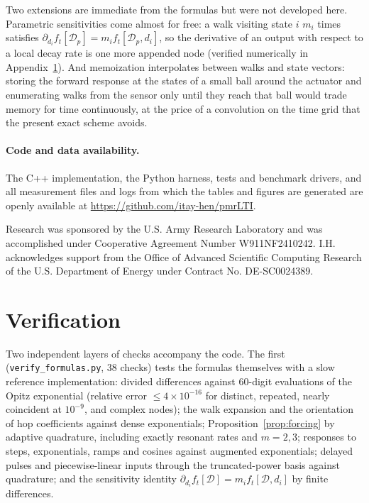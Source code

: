 \documentclass[aps,pra,superscriptaddress,floatfix,longbibliography,twocolumn]{revtex4-2}
\begin{document}
Two extensions are immediate from the formulas but were not developed here. Parametric sensitivities come almost for free: a walk visiting state $i$ $m_i$ times satisfies $\partial_{d_i}f_t[\mathcal{D}_p]=m_if_t[\mathcal{D}_p,d_i]$, so the derivative of an output with respect to a local decay rate is one more appended node (verified numerically in Appendix~\ref{app:verification}). And memoization interpolates between walks and state vectors: storing the forward response at the states of a small ball around the actuator and enumerating walks from the sensor only until they reach that ball would trade memory for time continuously, at the price of a convolution on the time grid that the present exact scheme avoids.

\paragraph*{Code and data availability.} The C++ implementation, the Python harness, tests and benchmark drivers, and all measurement files and logs from which the tables and figures are generated are openly available at \url{https://github.com/itay-hen/pmrLTI}.

\begin{acknowledgments}
Research was sponsored by the U.S. Army Research Laboratory and was accomplished under Cooperative Agreement Number W911NF2410242. I.H. acknowledges support from the Office of Advanced Scientific Computing Research of the U.S. Department of Energy under Contract No. DE-SC0024389.
\end{acknowledgments}

\appendix
\section{Verification}\label{app:verification}

Two independent layers of checks accompany the code. The first (\texttt{verify\_formulas.py}, 38 checks) tests the formulas themselves with a slow reference implementation: divided differences against 60-digit evaluations of the Opitz exponential (relative error $\le4\times10^{-16}$ for distinct, repeated, nearly coincident at $10^{-9}$, and complex nodes); the walk expansion and the orientation of hop coefficients against dense exponentials; Proposition~\ref{prop:forcing} by adaptive quadrature, including exactly resonant rates and $m=2,3$; responses to steps, exponentials, ramps and cosines against augmented exponentials; delayed pulses and piecewise-linear inputs through the truncated-power basis against quadrature; and the sensitivity identity $\partial_{d_i}f_t[\mathcal{D}]=m_if_t[\mathcal{D},d_i]$ by finite differences.
\end{document}
